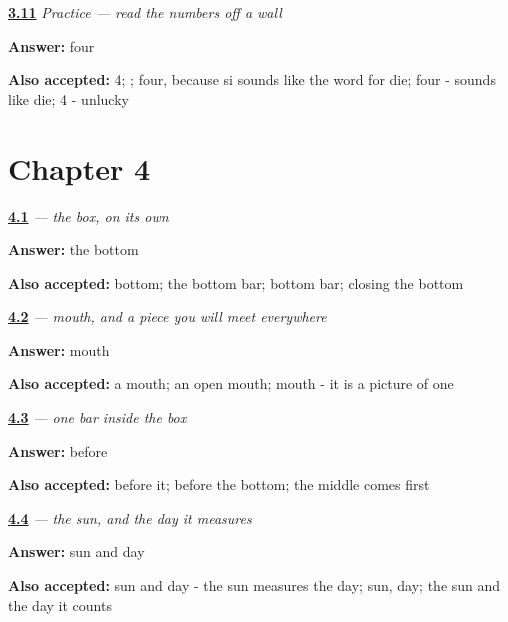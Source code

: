 \noindent\begin{minipage}[t]{\linewidth}
\raggedright
\hyperlink{review-ZH-C03-practice-lift}{\textbf{3.11}} \emph{Practice — read the numbers off a wall}\par
\small \textbf{Answer:} four\par
\footnotesize \textbf{Also accepted:} 4; ; four, because si sounds like the word for die; four - sounds like die; 4 - unlucky
\end{minipage}\par\medskip

\section*{Chapter 4}

\noindent\begin{minipage}[t]{\linewidth}
\raggedright
\hyperlink{review-ZH-W04-kou-last}{\textbf{4.1}} \emph{ — the box, on its own}\par
\small \textbf{Answer:} the bottom\par
\footnotesize \textbf{Also accepted:} bottom; the bottom bar; bottom bar; closing the bottom
\end{minipage}\par\medskip

\noindent\begin{minipage}[t]{\linewidth}
\raggedright
\hyperlink{review-ZH-C04-kou-meaning}{\textbf{4.2}} \emph{ — mouth, and a piece you will meet everywhere}\par
\small \textbf{Answer:} mouth\par
\footnotesize \textbf{Also accepted:} a mouth; an open mouth; mouth - it is a picture of one
\end{minipage}\par\medskip

\noindent\begin{minipage}[t]{\linewidth}
\raggedright
\hyperlink{review-ZH-W04-ri-order}{\textbf{4.3}} \emph{ — one bar inside the box}\par
\small \textbf{Answer:} before\par
\footnotesize \textbf{Also accepted:} before it; before the bottom; the middle comes first
\end{minipage}\par\medskip

\noindent\begin{minipage}[t]{\linewidth}
\raggedright
\hyperlink{review-ZH-C04-ri-two}{\textbf{4.4}} \emph{ — the sun, and the day it measures}\par
\small \textbf{Answer:} sun and day\par
\footnotesize \textbf{Also accepted:} sun and day - the sun measures the day; sun, day; the sun and the day it counts
\end{minipage}\par\medskip

